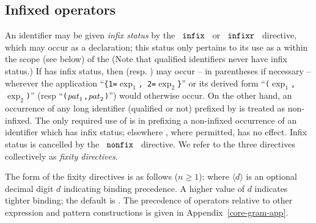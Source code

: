 \subsection{Infixed operators}
\label{infop.sec}
An identifier may be given {\sl infix status} by the
~${\tt infix}$~ or ~${\tt infixr}$~ directive, which may occur as a
declaration; this status only pertains to its use as a 
 within the scope (see below) of the 
(Note that qualified identifiers never have infix status.)  If 
\replacement{\theidstatus}{$\id$}{$\vid$}
has infix status, then  
(resp. ) may occur -- in parentheses if necessary -- wherever
the application ``\replacement{\theidstatus}{$\id$}{$\vid$}\verb+{+{\tt 1=}$\exp_1$\verb+,+{\tt
2=}$\exp_2$\verb+}+'' or its derived form
``\replacement{\theidstatus}{$\id$}{$\vid$}\verb+(+$\exp_1$\verb+,+$\exp_2$\verb+)+'' (resp
``\replacement{\theidstatus}{$\id$}{$\vid$}\verb+(+${\it pat}_1$\verb+,+${\it pat}_2$\verb+)+'') would otherwise
occur.  On the other hand, an occurrence of any long identifier (qualified
or not) prefixed by {\OP} is treated as non-infixed. The only required
use of {\OP} is in prefixing a non-infixed occurrence of an
identifier \replacement{\theidstatus}{$\id$}{$\vid$} which has infix status; elsewhere {\OP}, where
permitted, has no effect.\index{9.1}
Infix status is cancelled by the ~${\tt nonfix}$~
directive.  We refer to the three directives collectively as {\sl
fixity directives}.

The form of the fixity directives is as follows ($n\geq 1$):
\replacement{\theidstatus}{\[ \longinfix \]
\[ \longinfixr \]
\[ \longnonfix \]}{\[ \newlonginfix \]
\[ \newlonginfixr \]
\[ \newlongnonfix \]}where $\langle d\rangle$ is an optional decimal digit $d$ indicating
binding precedence. A higher value of $d$ indicates tighter binding;
the default is \replacement{\thefixtypos}{$0$}{{\tt 0}}.  
The precedence of  operators relative
to other expression and pattern constructions is given in
Appendix~\ref{core-gram-app}.

